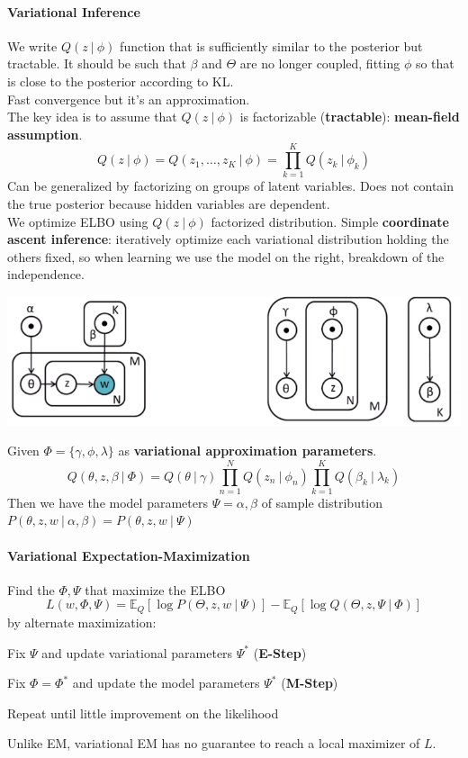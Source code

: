 \documentclass[10pt]{report}
\begin{document}
\paragraph{Variational Inference} We write $Q(z\:|\:\phi)$ function that is sufficiently similar to the posterior but tractable. It should be such that $\beta$ and $\Theta$ are no longer coupled, fitting $\phi$ so that is close to the posterior according to KL.\\
Fast convergence but it's an approximation.\\
The key idea is to assume that $Q(z\:|\:\phi)$ is factorizable (\textbf{tractable}): \textbf{mean-field assumption}.
$$Q(z\:|\:\phi) = Q(z_1,\ldots,z_K\:|\:\phi)=\prod_{k=1}^K Q(z_k\:|\:\phi_k)$$
Can be generalized by factorizing on groups of latent variables. Does not contain the true posterior because hidden variables are dependent.\\
We optimize ELBO using $Q(z\:|\:\phi)$ factorized distribution. Simple \textbf{coordinate ascent inference}: iteratively optimize each variational distribution holding the others fixed, so when learning we use the model on the right, breakdown of the independence.
\begin{center}
	\includegraphics[scale=0.5]{42.png}
\end{center}
Given $\Phi=\{\gamma,\phi,\lambda\}$ as \textbf{variational approximation parameters}.
$$Q(\theta,z,\beta\:|\:\Phi) = Q(\theta\:|\:\gamma)\prod_{n=1}^NQ(z_n\:|\:\phi_n)\prod_{k=1}^KQ(\beta_k\:|\:\lambda_k)$$
Then we have the model parameters $\Psi=\alpha,\beta$ of sample distribution $P(\theta,z,w\:|\:\alpha,\beta)=P(\theta,z,w\:|\:\Psi)$
\paragraph{Variational Expectation-Maximization} Find the $\Phi, \Psi$ that maximize the ELBO
$$L(w,\Phi,\Psi) = \mathbb{E}_Q[\log P(\Theta,z,w\:|\:\Psi)] - \mathbb{E}_Q[\log Q(\Theta,z,\Psi\:|\:\Phi)]$$
by alternate maximization:
\begin{list}{}{}
	\item Fix $\Psi$ and update variational parameters $\Psi^*$ (\textbf{E-Step})
	\item Fix $\Phi = \Phi^*$ and update the model parameters $\Psi^*$ (\textbf{M-Step})
	\item Repeat until little improvement on the likelihood
\end{list}
Unlike EM, variational EM has no guarantee to reach a local maximizer of $L$.
\pagebreak
\end{document}
